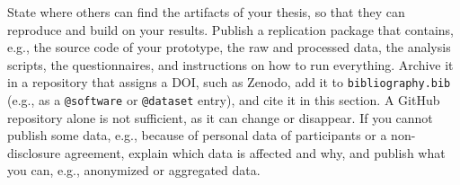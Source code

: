 State where others can find the artifacts of your thesis, so that they can reproduce and build on your results.
Publish a replication package that contains, e.g., the source code of your prototype, the raw and processed data, the analysis scripts, the questionnaires, and instructions on how to run everything.
Archive it in a repository that assigns a DOI, such as Zenodo, add it to \texttt{bibliography.bib} (e.g., as a \texttt{@software} or \texttt{@dataset} entry), and cite it in this section.
A GitHub repository alone is not sufficient, as it can change or disappear.
If you cannot publish some data, e.g., because of personal data of participants or a non-disclosure agreement, explain which data is affected and why, and publish what you can, e.g., anonymized or aggregated data.
